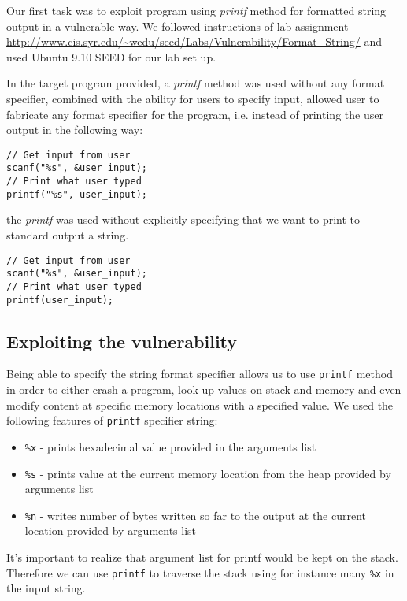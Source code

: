 \documentclass[12pt, a4paper, pdflatex]{article}
\begin{document}
Our first task was to exploit program using \emph{printf} method for formatted string output in a vulnerable way. We followed instructions of lab assignment  \url{http://www.cis.syr.edu/~wedu/seed/Labs/Vulnerability/Format_String/}
and used Ubuntu 9.10 SEED for our lab set up.

In the target program provided, a \emph{printf} method was used without any format specifier, combined with the ability for users to specify input, allowed user to fabricate any format specifier for the program, i.e. instead of printing the user output in the following way:
\vspace{1em}
\lstset{
	captionpos=b,
	frame=single,
	language=C,
  breaklines=true,
	caption=Fragment of code that would not include the vulnerability,
	label=chroot:vul
}
\begin{lstlisting}
// Get input from user
scanf("%s", &user_input);
// Print what user typed
printf("%s", user_input);
\end{lstlisting}
the \emph{printf} was used without explicitly specifying that we want to print to standard output a string.
\vspace{1em}
\lstset{
	captionpos=b,
	frame=single,
	language=C,
  breaklines=true,
	caption=Fragment of includes the vulnerability,
	label=chroot:vul2
}
\begin{lstlisting}
// Get input from user
scanf("%s", &user_input);
// Print what user typed
printf(user_input);
\end{lstlisting}


\subsection{Exploiting the vulnerability}
Being able to specify the string format specifier allows us to use \texttt{printf} method in order to either crash a program, look up values on stack and memory and even modify content at specific memory locations with a specified value. We used the following features of \texttt{printf} specifier string:
\begin{itemize}
	\item \texttt{\%x} - prints hexadecimal value provided in the arguments list
	\item \texttt{\%s} - prints value at the current memory location from the heap provided by arguments list
	\item \texttt{\%n} - writes number of bytes written so far to the output at the current location provided by arguments list
\end{itemize}
It's important to realize that argument list for printf would be kept on the stack. Therefore we can use \texttt{printf} to traverse the stack using for instance many \texttt{\%x} in the input string.
\end{document}
